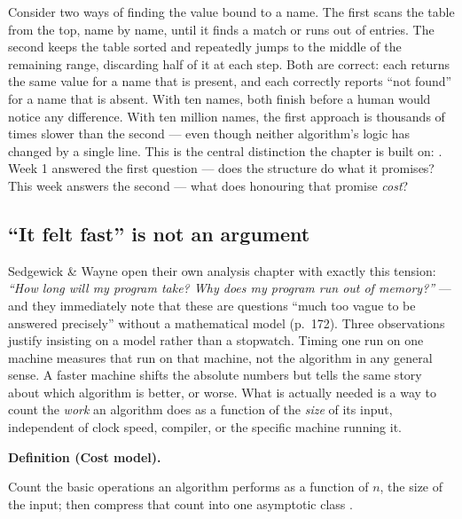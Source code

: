 \documentclass[11pt]{article}
\newenvironment{definitionbox}[1]{%
  \par\noindent\textbf{Definition (#1).}\ \itshape
}{\par\vspace{0.3em}}
\begin{document}
Consider two ways of finding the value bound to a name. The first scans the
table from the top, name by name, until it finds a match or runs out of
entries. The second keeps the table sorted and repeatedly jumps to the
middle of the remaining range, discarding half of it at each step. Both are
correct: each returns the same value for a name that is present, and each
correctly reports ``not found'' for a name that is absent. With ten names,
both finish before a human would notice any difference. With ten million
names, the first approach is thousands of times slower than the second ---
even though neither algorithm's logic has changed by a single line. This is
the central distinction the chapter is built on: . Week 1 answered the first question --- does
the structure do what it promises? This week answers the second --- what
does honouring that promise \emph{cost}?

\subsection{``It felt fast'' is not an argument}

Sedgewick \& Wayne open their own analysis chapter with exactly this
tension: \emph{``How long will my program take? Why does my program run out
of memory?''} --- and they immediately note that these are questions ``much
too vague to be answered precisely'' without a mathematical model
\cite{Sedgewick2011_algorithms} (p.~172). Three observations justify
insisting on a model rather than a stopwatch. Timing one run on one machine
measures that run on that machine, not the algorithm in any general sense.
A faster machine shifts the absolute numbers but tells the same story about
which algorithm is better, or worse. What is actually needed is a way to
count the \emph{work} an algorithm does as a function of the \emph{size} of
its input, independent of clock speed, compiler, or the specific machine
running it.

\begin{definitionbox}{Cost model}
Count the basic operations an algorithm performs as a function of $n$, the
size of the input; then compress that count into one asymptotic class
\cite{HorowitzSahni2008_fundamentals_data_structures,Neapolitan2010_foundations_of_algorithms}.
\end{definitionbox}
\end{document}
